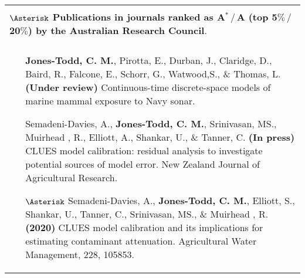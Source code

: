 \documentclass[12pt, a4paper]{article}
\begin{document}
\begin{center}\begin{longtable}{|p{16.3 cm}|}
\hline \cellcolor[gray]{0.8}{\bf 2a.  Research publications and dissemination}  \\
{\bf $\Asterisk$ Publications in journals ranked as A${}^\ast\,/\,$A (top 5$\%\,/\,$20$\%$) by the Australian Research Council}.\\
\hline \cellcolor[gray]{0.8}{Peer reviewed journal articles}  \\
\hline
\begin{itemize}
\item[] {\bf Jones-Todd, C. M.}, Pirotta, E., Durban, J., Claridge, D., Baird, R., Falcone, E., Schorr, G., Watwood,S., \& Thomas, L.  \textbf{(Under review)} Continuous-time discrete-space models of marine mammal exposure to Navy sonar.
\item[] Semadeni-Davies, A., \textbf{Jones-Todd, C. M.}, Srinivasan, MS.,  Muirhead , R.,  Elliott, A., Shankar, U., \& Tanner, C. \textbf{(In press)} CLUES model calibration: residual analysis to investigate potential sources of model error. New Zealand Journal of Agricultural Research.
\item[$\Asterisk$] Semadeni-Davies, A., {\bf Jones-Todd, C. M.},  Elliott, S., Shankar, U., Tanner, C., Srinivasan, MS., \& Muirhead , R. {\bf(2020)} CLUES model calibration and its implications for estimating contaminant attenuation. Agricultural Water Management, 228, 105853.

\end{itemize}
\end{longtable}
\end{center}
\end{document}
